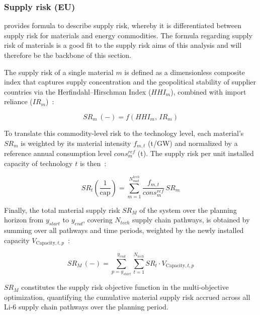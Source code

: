     \subsubsection{Supply risk (EU)} 
    \label{subsec_supply_risk}
    \textcite{colucciCombinedAssessmentMaterial2025} provides formula to describe supply risk, whereby it is differentiated between supply risk for materials and energy commodities. The formula regarding supply risk of materials is a good fit to the supply risk aims of this analysis and will therefore be the backbone of this section.

    \begingroup\color{red}
    The supply risk of a single material $m$ is defined as a dimensionless composite index that captures supply concentration and the geopolitical stability of supplier countries via the Herfindahl--Hirschman Index ($HHI_m$), combined with import reliance ($IR_m$)~\cite{colucciCombinedAssessmentMaterial2025}:

    \begin{equation}
        SR_m \, (-) = f(HHI_m,\, IR_m)
        \label{eq:SR_m}
    \end{equation}

    To translate this commodity-level risk to the technology level, each material's $SR_m$ is weighted by its material intensity $f_{m,t}$ (t/GW) and normalized by a reference annual consumption level $cons_m^{ref}$ (t). The supply risk per unit installed capacity of technology $t$ is then~\cite{colucciCombinedAssessmentMaterial2025}:

    \begin{equation}
        SR_t \left(\frac{1}{\text{cap}}\right) = \sum_{m=1}^{N_{mat}^{tech}} \frac{f_{m,t}}{cons_m^{ref}} \, SR_m
        \label{eq:SR_t}
    \end{equation}

    Finally, the total material supply risk $SR_M$ of the system over the planning horizon from $y_{start}$ to $y_{end}$, covering $N_{tech}$ supply chain pathways, is obtained by summing over all pathways and time periods, weighted by the newly installed capacity $V_{\mathrm{Capacity},t,p}$~\cite{colucciCombinedAssessmentMaterial2025}:

    \begin{equation}
        SR_M \, (-) = \sum_{p=y_{start}}^{y_{end}} \sum_{t=1}^{N_{tech}} SR_t \cdot V_{\mathrm{Capacity},t,p}
        \label{eq:SR_M}
    \end{equation}

    $SR_M$ constitutes the supply risk objective function in the multi-objective optimization, quantifying the cumulative material supply risk accrued across all Li-6 supply chain pathways over the planning period.
    \endgroup

